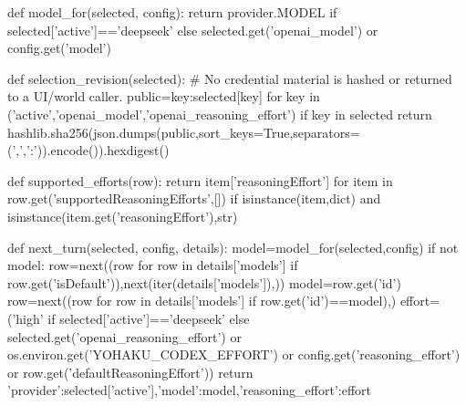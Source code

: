 def model_for(selected, config):
    return provider.MODEL if selected['active']=='deepseek' else selected.get('openai_model') or config.get('model')


def selection_revision(selected):
    # No credential material is hashed or returned to a UI/world caller.
    public={key:selected[key] for key in ('active','openai_model','openai_reasoning_effort') if key in selected}
    return hashlib.sha256(json.dumps(public,sort_keys=True,separators=(',',':')).encode()).hexdigest()


def supported_efforts(row):
    return {item['reasoningEffort'] for item in row.get('supportedReasoningEfforts',[])
            if isinstance(item,dict) and isinstance(item.get('reasoningEffort'),str)}


def next_turn(selected, config, details):
    model=model_for(selected,config)
    if not model:
        row=next((row for row in details['models'] if row.get('isDefault')),next(iter(details['models']),{}))
        model=row.get('id')
    row=next((row for row in details['models'] if row.get('id')==model),{})
    effort=('high' if selected['active']=='deepseek' else selected.get('openai_reasoning_effort')
            or os.environ.get('YOHAKU_CODEX_EFFORT') or config.get('reasoning_effort') or row.get('defaultReasoningEffort'))
    return {'provider':selected['active'],'model':model,'reasoning_effort':effort}


